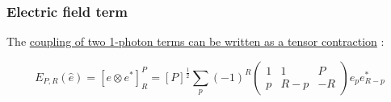 \documentclass[10pt]{article}
\begin{document}




\subsubsection{Electric field term}\label{electric-field-term}

The
\href{https://epsproc.readthedocs.io/en/latest/methods/geometric_method_dev_260220_090420_tidy.html\#E_\%7BP,R\%7D-tensor}{coupling
of two 1-photon terms can be written as a tensor contraction} \cite{BlumDensityMat,zareAngMom}:

\begin{equation}
E_{P,R}(\hat{e})=[e\otimes e^{*}]_{R}^{P}=[P]^{\frac{1}{2}}\sum_{p}(-1)^{R}\left(\begin{array}{ccc}
1 & 1 & P\\
p & R-p & -R
\end{array}\right)e_{p}e_{R-p}^{*}
\label{eq:EPR-defn-1}
\end{equation}
\end{document}
